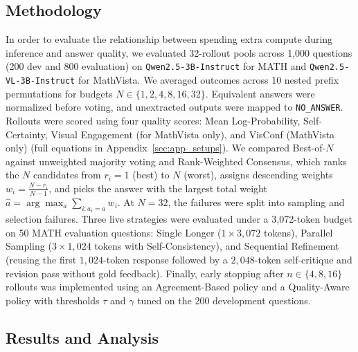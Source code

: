 \documentclass{article}
\begin{document}
\subsection{Methodology}
\label{sec:task3_methodology}

In order to evaluate the relationship between spending extra compute during inference and answer quality, we evaluated 32-rollout pools across 1,000 questions (200 dev and 800 evaluation) on \texttt{Qwen2.5-3B-Instruct} for MATH and \texttt{Qwen2.5-VL-3B-Instruct} for MathVista. We averaged outcomes across 10 nested prefix permutations for budgets $N \in \{1, 2, 4, 8, 16, 32\}$. Equivalent answers were normalized before voting, and unextracted outputs were mapped to \texttt{NO\_ANSWER}. Rollouts were scored using four quality scores: Mean Log-Probability, Self-Certainty, Visual Engagement (for MathVista only), and VisConf (MathVista only) (full equations in Appendix~\ref{sec:app_setups}). We compared Best-of-$N$ against unweighted majority voting and Rank-Weighted Consensus, which ranks the $N$ candidates from $r_i = 1$ (best) to $N$ (worst), assigns descending weights $w_i = \frac{N - r_i}{N - 1}$, and picks the answer with the largest total weight $\hat{a} = \arg\max_a \sum_{i: a_i = a} w_i$. At $N=32$, the failures were split into sampling and selection failures. Three live strategies were evaluated under a 3,072-token budget on 50 MATH evaluation questions: Single Longer ($1 \times 3,072$ tokens), Parallel Sampling ($3 \times 1,024$ tokens with Self-Consistency), and Sequential Refinement (reusing the first $1,024$-token response followed by a $2,048$-token self-critique and revision pass without gold feedback). Finally, early stopping after $n \in \{4, 8, 16\}$ rollouts was implemented using an Agreement-Based policy and a Quality-Aware policy with thresholds $\tau$ and $\gamma$ tuned on the 200 development questions.

\subsection{Results and Analysis}
\label{sec:task3_results}
\end{document}
